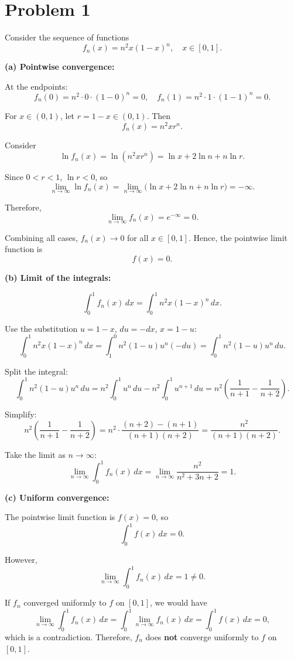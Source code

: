 \documentclass[12pt]{article}
\begin{document}
\section*{Problem 1}
Consider the sequence of functions
\[
	f_n(x) = n^2 x (1-x)^n, \quad x \in [0,1].
\]

\textbf{(a) Pointwise convergence:}

At the endpoints:
\[
	f_n(0) = n^2 \cdot 0 \cdot (1-0)^n = 0, \quad
	f_n(1) = n^2 \cdot 1 \cdot (1-1)^n = 0.
\]

For \( x \in (0,1) \), let \( r = 1-x \in (0,1) \). Then
\[
	f_n(x) = n^2 x r^n.
\]

Consider
\[
	\ln f_n(x) = \ln(n^2 x r^n) = \ln x + 2 \ln n + n \ln r.
\]

Since \( 0<r<1 \), \( \ln r < 0 \), so
\[
	\lim_{n \to \infty} \ln f_n(x) = \lim_{n \to \infty} \big( \ln x + 2 \ln n + n \ln r \big) = -\infty.
\]

Therefore,
\[
	\lim_{n \to \infty} f_n(x) = e^{-\infty} = 0.
\]

Combining all cases, \( f_n(x) \to 0 \) for all \( x \in [0,1] \). Hence, the pointwise limit function is
\[
	f(x) = 0.
\]

\textbf{(b) Limit of the integrals:}

\[
	\int_0^1 f_n(x) \, dx = \int_0^1 n^2 x (1-x)^n \, dx.
\]

Use the substitution \( u = 1-x \), \( du = -dx \), \( x = 1-u \):
\[
	\int_0^1 n^2 x (1-x)^n \, dx = \int_1^0 n^2 (1-u) u^n (-du) = \int_0^1 n^2 (1-u) u^n \, du.
\]

Split the integral:
\[
	\int_0^1 n^2 (1-u) u^n \, du = n^2 \int_0^1 u^n \, du - n^2 \int_0^1 u^{n+1} \, du = n^2 \left( \frac{1}{n+1} - \frac{1}{n+2} \right).
\]

Simplify:
\[
	n^2 \left( \frac{1}{n+1} - \frac{1}{n+2} \right) = n^2 \cdot \frac{(n+2)-(n+1)}{(n+1)(n+2)} = \frac{n^2}{(n+1)(n+2)}.
\]

Take the limit as \( n \to \infty \):
\[
	\lim_{n \to \infty} \int_0^1 f_n(x) \, dx = \lim_{n \to \infty} \frac{n^2}{n^2 + 3n + 2} = 1.
\]

\textbf{(c) Uniform convergence:}

The pointwise limit function is \( f(x) = 0 \), so
\[
	\int_0^1 f(x) \, dx = 0.
\]

However,
\[
	\lim_{n \to \infty} \int_0^1 f_n(x) \, dx = 1 \neq 0.
\]

If \( f_n \) converged uniformly to \( f \) on \([0,1]\), we would have
\[
	\lim_{n \to \infty} \int_0^1 f_n(x) \, dx = \int_0^1 \lim_{n \to \infty} f_n(x) \, dx = \int_0^1 f(x) \, dx = 0,
\]
which is a contradiction. Therefore, \( f_n \) does \textbf{not} converge uniformly to \( f \) on \([0,1]\).
\end{document}
